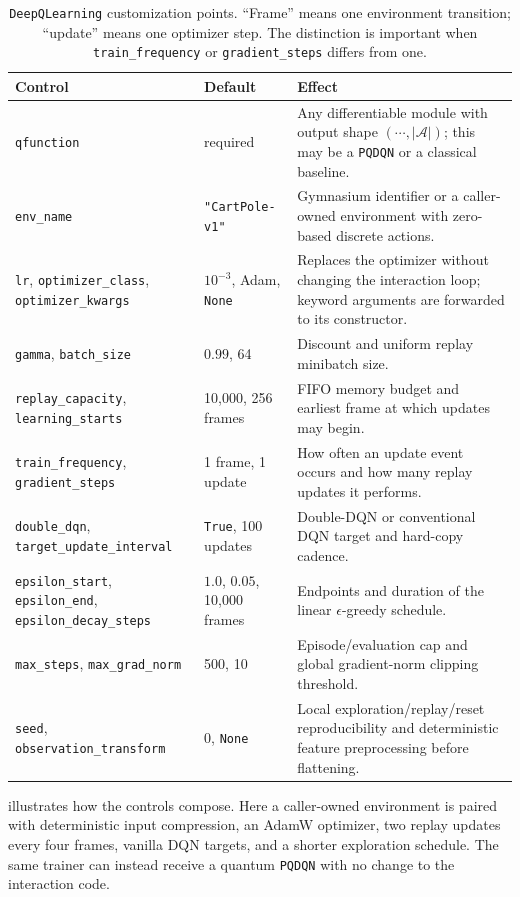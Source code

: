 \documentclass[10pt]{article}
\newcommand{\code}[1]{\texttt{#1}}
\newcommand{\A}{\mathcal{A}}
\begin{document}
\begin{table}[H]
\centering
\caption{\code{DeepQLearning} customization points.  ``Frame'' means one
environment transition; ``update'' means one optimizer step.  The distinction
is important when \code{train\_frequency} or \code{gradient\_steps} differs
from one.}
\label{tab:deepq-customization}
\small
\begin{tabularx}{\textwidth}{@{}p{}p{}X@{}}
\toprule
Control & Default & Effect \\
\midrule
\code{qfunction} & required & Any differentiable module with output shape
$({\cdots},|\A|)$; this may be a \code{PQDQN} or a classical baseline. \\
\code{env\_name} & \code{"CartPole-v1"} & Gymnasium identifier or a
caller-owned environment with zero-based discrete actions. \\
\code{lr}, \code{optimizer\_class}, \code{optimizer\_kwargs} &
$10^{-3}$, Adam, \code{None} & Replaces the optimizer without changing the
interaction loop; keyword arguments are forwarded to its constructor. \\
\code{gamma}, \code{batch\_size} & $0.99$, 64 & Discount and uniform replay
minibatch size. \\
\code{replay\_capacity}, \code{learning\_starts} & 10,000, 256 frames & FIFO
memory budget and earliest frame at which updates may begin. \\
\code{train\_frequency}, \code{gradient\_steps} & 1 frame, 1 update & How often
an update event occurs and how many replay updates it performs. \\
\code{double\_dqn}, \code{target\_update\_interval} & \code{True}, 100 updates
& Double-DQN or conventional DQN target and hard-copy cadence. \\
\code{epsilon\_start}, \code{epsilon\_end}, \code{epsilon\_decay\_steps} &
$1.0$, $0.05$, 10,000 frames & Endpoints and duration of the linear
$\epsilon$-greedy schedule. \\
\code{max\_steps}, \code{max\_grad\_norm} & 500, 10 & Episode/evaluation cap
and global gradient-norm clipping threshold. \\
\code{seed}, \code{observation\_transform} & 0, \code{None} & Local
exploration/replay/reset reproducibility and deterministic feature
preprocessing before flattening. \\
\bottomrule
\end{tabularx}
\end{table}

\clearpage
{} illustrates how the controls compose.  Here a
caller-owned environment is paired with deterministic input compression, an
AdamW optimizer, two replay updates every four frames, vanilla DQN targets,
and a shorter exploration schedule.  The same trainer can instead receive a
quantum \code{PQDQN} with no change to the interaction code.
\end{document}
